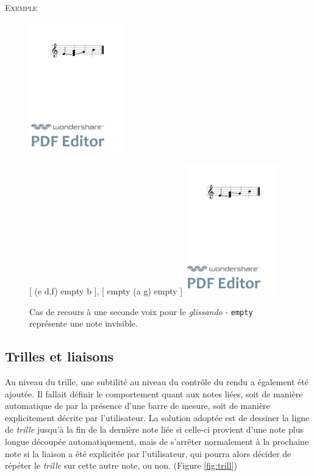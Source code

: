 \documentclass{article}
\newenvironment{gmncode}	{\vspace{-2mm}\small\verbatim}{\endverbatim\vspace{-2mm}}
\newcommand{\code}[1]		{{\small \texttt{#1}}}
\newcommand{\exemple}		{\vspace{2mm}\hspace*{-6mm}\textsc{Exemple}}
\begin{document}
\exemple
\begin{figure}[h]
\centering
\begin{gmncode}
[ \glissando(e {d,f,a} g) b ]
\end{gmncode}
\includegraphics[width=4cm]{img/glissandopb.pdf}

\begin{gmncode}
{ 
  [ \glissando(e {d,f}) empty b ],
  [  empty \glissando(a g) empty ] 
}
\end{gmncode}
\includegraphics[width=4cm]{img/glissandosanspb.pdf}
\caption{Cas de recours à une seconde voix pour le \emph{glissando} -
\code{empty} représente une note invisible.}
\label{fig:glissandopb}
\end{figure}


\subsection{Trilles et liaisons}\label{subsec:trillesLiaison}

Au niveau du trille, une subtilité au niveau du contr\^ole du rendu a également été ajoutée. Il fallait définir le comportement quant aux notes liées, soit de manière automatique de par la présence d'une barre de mesure, soit de manière explicitement décrite par l'utilisateur. La solution adoptée est de dessiner la ligne de \emph{trille} jusqu'à la fin de la dernière note liée si celle-ci provient d'une note plus longue découpée automatiquement, mais de s'arrêter normalement à la prochaine note si la liaison a été explicitée par l'utilisateur, qui pourra alors décider de répéter le \emph{trille} sur cette autre note, ou non. (Figure \ref{fig:trill})
\end{document}
